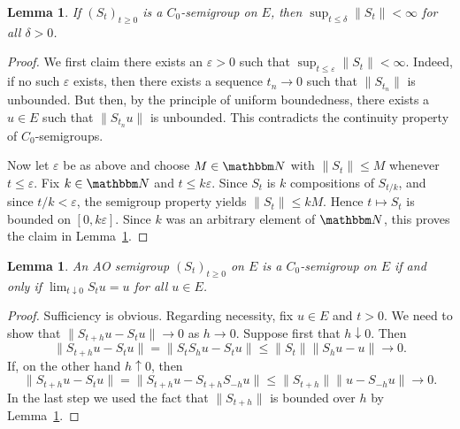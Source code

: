 \documentclass[12pt, reqno]{amsart}
\renewcommand{\leq}{\leqslant}
\renewcommand{\geq}{\geqslant}
\newcommand{\1}{\mathbbm 1}
\newcommand{\NN}{\mathbbm N}
\renewcommand{\epsilon}{\varepsilon}
\theoremstyle{plain}
\newtheorem{lemma}[theorem]{Lemma}
\theoremstyle{definition}
\begin{document}
\begin{lemma}\label{l:ubfc}
    If $(S_t)_{t \geq 0}$ is a $C_0$-semigroup on $E$, then
        $\sup_{t \leq \delta} \| S_t \| < \infty$ for all $\delta > 0$.
\end{lemma}

\begin{proof}
    We first claim there exists an $\epsilon > 0$ such that $
    \sup_{t \leq \epsilon} \| S_t \| < \infty$.  Indeed, if no such $\epsilon$
    exists, then there exists a sequence $t_n \to 0$ such that 
    $\|S_{t_n}\|$ is unbounded.  But then, by the principle of uniform
    boundedness, there exists a $u \in E$ such that $\|S_{t_n} u\|$ is
    unbounded.  This contradicts the continuity property of $C_0$-semigroups.

    Now let $\epsilon$ be as above and choose $M \in \NN$ with $\| S_t \| \leq
    M$ whenever $t \leq \epsilon$.  Fix $k \in \NN$ and $t \leq k \epsilon$.
    Since $S_t$ is $k$ compositions of $S_{t/k}$, and since $t/k < \epsilon$, 
    the semigroup property yields $\| S_t \| \leq k M$.  Hence $t \mapsto S_t$
    is bounded on $[0, k \epsilon]$.  Since $k$ was an arbitrary element of
    $\NN$, this proves the claim in Lemma~\ref{l:ubfc}.
\end{proof}

\begin{lemma}\label{l:semiequivcon}
    An AO semigroup $(S_t)_{t \geq 0}$ on $E$ is a 
    $C_0$-semigroup on $E$ if and only if $\lim_{t \downarrow 0} S_t u = u$ for all $u \in E$.
\end{lemma}

\begin{proof}
    Sufficiency is obvious.  Regarding necessity, fix $u \in E$ and $t > 0$.  We
    need to show that $\|S_{t+h} u - S_t u\| \to 0$ as $h \to 0$.  Suppose first
    that $h \downarrow 0$.  Then
    \begin{equation*}
        \|S_{t+h} u - S_t u\|  
        = \|S_t S_h u - S_t u\|  
        \leq \|S_t \| \| S_h u - u\|  \to 0.
    \end{equation*}
    If, on the other hand $h \uparrow 0$, then
    \begin{equation*}
        \|S_{t+h} u - S_t u\|  
        = \|S_{t+h} u - S_{t + h} S_{-h} u\|  
        \leq \|S_{t+h} \| \| u - S_{-h} u\| \to 0 .
    \end{equation*}
    In the last step we used the fact that $\|S_{t+h} \| $ is bounded over $h$
    by Lemma~\ref{l:ubfc}.
\end{proof}
\end{document}

